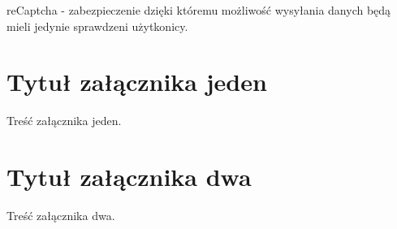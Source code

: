 \documentclass[brudnopis]{xmgr}
\begin{document}
reCaptcha - zabezpieczenie dzięki któremu możliwość wysyłania danych będą mieli jedynie sprawdzeni użytkonicy.

\summary

\appendix
\chapter{Tytuł załącznika jeden}

Treść załącznika jeden.

\chapter{Tytuł załącznika dwa}

Treść załącznika dwa.




\listoftables

\listoffigures

\oswiadczenie
\end{document}
